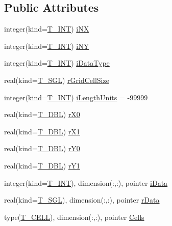 \subsection*{Public Attributes}
\begin{DoxyCompactItemize}
\item 
integer(kind=\hyperlink{namespacetypes_a4e4d040a4425196c4d43be63e7e6103a}{T\_\-INT}) \hyperlink{typetypes_1_1_t___g_e_n_e_r_a_l___g_r_i_d_a602b452f21a1bb62e0679ee1d4242642}{iNX}
\item 
integer(kind=\hyperlink{namespacetypes_a4e4d040a4425196c4d43be63e7e6103a}{T\_\-INT}) \hyperlink{typetypes_1_1_t___g_e_n_e_r_a_l___g_r_i_d_a1df927ec7c6b2f6e1ca55c78fa33161b}{iNY}
\item 
integer(kind=\hyperlink{namespacetypes_a4e4d040a4425196c4d43be63e7e6103a}{T\_\-INT}) \hyperlink{typetypes_1_1_t___g_e_n_e_r_a_l___g_r_i_d_acff6c7004f31277df73101b20d58c238}{iDataType}
\item 
real(kind=\hyperlink{namespacetypes_af3012489af4c138f271f1bce244b7e51}{T\_\-SGL}) \hyperlink{typetypes_1_1_t___g_e_n_e_r_a_l___g_r_i_d_ac411b2b0e3ac0e4b0b70a505bf299f31}{rGridCellSize}
\item 
integer(kind=\hyperlink{namespacetypes_a4e4d040a4425196c4d43be63e7e6103a}{T\_\-INT}) \hyperlink{typetypes_1_1_t___g_e_n_e_r_a_l___g_r_i_d_af7072f4f41c1617bc6d4483de288ecef}{iLengthUnits} = -\/99999
\item 
real(kind=\hyperlink{namespacetypes_a888737411068474a167b1c3e5b579c58}{T\_\-DBL}) \hyperlink{typetypes_1_1_t___g_e_n_e_r_a_l___g_r_i_d_a6c92e6d2f68058391652ed23d1ab68b0}{rX0}
\item 
real(kind=\hyperlink{namespacetypes_a888737411068474a167b1c3e5b579c58}{T\_\-DBL}) \hyperlink{typetypes_1_1_t___g_e_n_e_r_a_l___g_r_i_d_a7f01e90a3c37c3e735f8ec177619dc49}{rX1}
\item 
real(kind=\hyperlink{namespacetypes_a888737411068474a167b1c3e5b579c58}{T\_\-DBL}) \hyperlink{typetypes_1_1_t___g_e_n_e_r_a_l___g_r_i_d_aa743b65f5f84b8835d280c54fc5f6617}{rY0}
\item 
real(kind=\hyperlink{namespacetypes_a888737411068474a167b1c3e5b579c58}{T\_\-DBL}) \hyperlink{typetypes_1_1_t___g_e_n_e_r_a_l___g_r_i_d_a8f03f64e3989eb22d90f200d787fc440}{rY1}
\item 
integer(kind=\hyperlink{namespacetypes_a4e4d040a4425196c4d43be63e7e6103a}{T\_\-INT}), dimension(:,:), pointer \hyperlink{typetypes_1_1_t___g_e_n_e_r_a_l___g_r_i_d_aeb0bc4b49c62ee70efea7dc02a641a3c}{iData}
\item 
real(kind=\hyperlink{namespacetypes_af3012489af4c138f271f1bce244b7e51}{T\_\-SGL}), dimension(:,:), pointer \hyperlink{typetypes_1_1_t___g_e_n_e_r_a_l___g_r_i_d_aeef2b926ed39eb235cbb1a2478e38f4c}{rData}
\item 
type(\hyperlink{typetypes_1_1_t___c_e_l_l}{T\_\-CELL}), dimension(:,:), pointer \hyperlink{typetypes_1_1_t___g_e_n_e_r_a_l___g_r_i_d_a1ae4dd93dfc3e0cb8c8d83393bbbbe7f}{Cells}
\end{DoxyCompactItemize}


